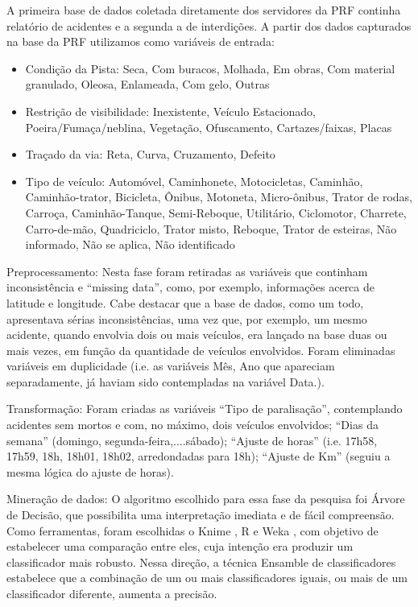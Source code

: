 A primeira base de dados coletada diretamente dos servidores da PRF continha relatório de acidentes e a segunda a de interdições. A partir dos dados capturados na base da PRF utilizamos como variáveis de entrada:

\begin{itemize}
 \item Condição da Pista: {Seca, Com buracos, Molhada, Em obras, Com material granulado, Oleosa, Enlameada, Com gelo, Outras}
 \item Restrição de visibilidade: {Inexistente, Veículo Estacionado, Poeira/Fumaça/neblina, Vegetação, Ofuscamento, Cartazes/faixas, Placas}
 \item Traçado da via: {Reta, Curva, Cruzamento, Defeito}
 \item Tipo de veículo: {Automóvel, Caminhonete, Motocicletas, Caminhão, Caminhão-trator, Bicicleta, Ônibus, Motoneta, Micro-ônibus, Trator de rodas, Carroça, Caminhão-Tanque, Semi-Reboque, Utilitário, Ciclomotor, Charrete, Carro-de-mão, Quadriciclo, Trator misto, Reboque, Trator de esteiras, Não informado, Não se aplica, Não identificado}
\end{itemize}

Preprocessamento: Nesta fase foram retiradas as variáveis que continham inconsistência e “missing data”, como, por exemplo, informações acerca de latitude e longitude. Cabe destacar que a base de dados, como um todo, apresentava sérias inconsistências, uma vez que, por exemplo,
um mesmo acidente, quando envolvia dois ou mais veículos,
era lançado na base duas ou mais vezes, em função da
quantidade de veículos envolvidos. Foram eliminadas variáveis
em duplicidade (i.e. as variáveis Mês, Ano que apareciam
separadamente, já haviam sido contempladas na variável Data.).

Transformação: Foram criadas as variáveis “Tipo de
paralisação”, contemplando acidentes sem mortos e com, no
máximo, dois veículos envolvidos; “Dias da semana”
(domingo, segunda-feira,....sábado); “Ajuste de horas” (i.e. 17h58, 17h59, 18h, 18h01, 18h02, arredondadas para 18h);
“Ajuste de Km” (seguiu a mesma lógica do ajuste de horas).

Mineração de dados: O algoritmo escolhido para essa fase da pesquisa
foi Árvore de Decisão, que possibilita uma interpretação
imediata e de fácil compreensão. Como ferramentas, foram
escolhidas o Knime \cite{Knime}, R \cite{R-cran} e Weka \cite{Weka}, com objetivo
de estabelecer uma comparação entre eles, cuja intenção era
produzir um classificador mais robusto. Nessa direção, a
técnica Ensamble de classificadores \cite{Bernardini} estabelece que a
combinação de um ou mais classificadores iguais, ou mais de
um classificador diferente, aumenta a precisão. 

